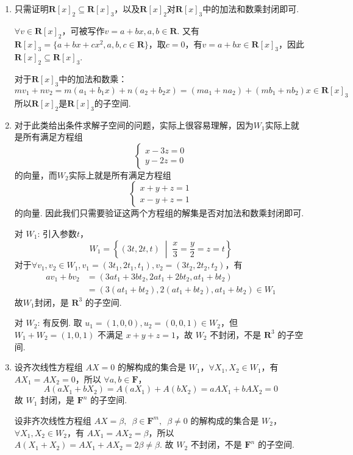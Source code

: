 \begin{solution}
    \begin{enumerate}
        \item 只需证明$\mathbf{R}[x]_2 \subseteq \mathbf{R}[x]_3$，以及$\mathbf{R}[x]_2$对$\mathbf{R}[x]_3$中的加法和数乘封闭即可.

              $\forall v \in \mathbf{R}[x]_2$，可被写作$v=a+bx,a,b \in \mathbf{R}$. 又有$\mathbf{R}[x]_3=\{a+bx+cx^2,a,b,c \in \mathbf{R}\}$，取$c=0$，有$v=a+bx \in \mathbf{R}[x]_3$，因此$\mathbf{R}[x]_2 \subseteq \mathbf{R}[x]_3$.

              对于$\mathbf{R}[x]_3$中的加法和数乘：
              \[mv_1+nv_2=m(a_1+b_1x)+n(a_2+b_2x)=(ma_1+na_2)+(mb_1+nb_2)x \in \mathbf{R}[x]_3\]
              所以$\mathbf{R}[x]_2$是$\mathbf{R}[x]_3$的子空间.

        \item 对于此类给出条件求解子空间的问题，实际上很容易理解，因为$W_1$实际上就是所有满足方程组
              \[\begin{cases}
                      x-3z=0 \\
                      y-2z=0
                  \end{cases}\]
              的向量，而$W_2$实际上就是所有满足方程组
              \[\begin{cases}
                      x+y+z=1 \\
                      x-y+z=1
                  \end{cases}\]
              的向量. 因此我们只需要验证这两个方程组的解集是否对加法和数乘封闭即可.

              对 $W_1$: 引入参数$t$，
              \[W_1=\left\{(3t,2t,t) \;\middle|\; \frac{x}{3} = \frac{y}{2} = z = t\right\}\]
              对于$\forall v_1, v_2 \in W_1, v_1 = (3t_1, 2t_1, t_1), v_2 = (3t_2, 2t_2, t_2)$，有
              \begin{align*}
                  av_1 + bv_2 & = (3at_1 + 3bt_2, 2at_1 + 2bt_2, at_1 + bt_2)           \\
                              & = (3(at_1 + bt_2), 2(at_1 + bt_2), at_1 + bt_2) \in W_1
              \end{align*}
              故$W_1$封闭，是 $\mathbf{R}^3$ 的子空间.

              对 $W_2$: 有反例. 取 $u_1 = (1, 0, 0), u_2 = (0, 0, 1) \in W_2$，但 $W_1 + W_2 = (1, 0, 1)$ 不满足 $x + y + z = 1$，故 $W_2$ 不封闭，不是 $\mathbf{R}^3$ 的子空间.

        \item 设齐次线性方程组 $AX=0$ 的解构成的集合是 $W_1$，$\forall X_1, X_2 \in W_1$，有 $AX_1 = AX_2 = 0$，所以 $\forall a, b \in \mathbf{F}$，
              \[A(a X_1 + b X_2) = A(a X_1) + A(b X_2) = a AX_1 + b AX_2 = 0\]
              故 $W_1$ 封闭，是 $\mathbf{F}^n$ 的子空间.

              设非齐次线性方程组 $AX = \beta,\enspace \beta \in \mathbf{F}^m,\enspace \beta \neq 0$ 的解构成的集合是 $W_2$，$\forall X_1, X_2 \in W_2$，有 $AX_1 = AX_2 = \beta$，所以 $A(X_1 + X_2) = AX_1 + AX_2 = 2\beta \neq \beta$. 故 $W_2$ 不封闭，不是 $\mathbf{F}^n$ 的子空间.
    \end{enumerate}
\end{solution}

